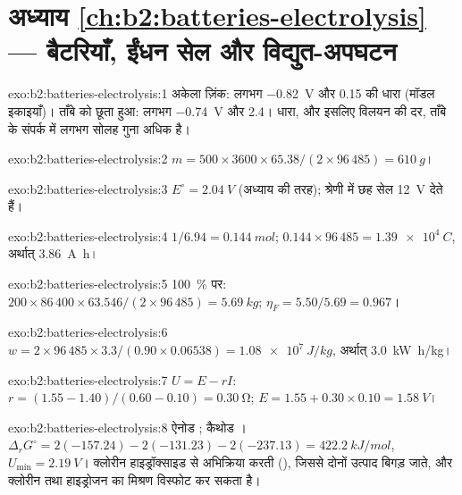 \section*{अध्याय \ref{ch:b2:batteries-electrolysis} --- बैटरियाँ, ईंधन सेल और विद्युत-अपघटन}

\begin{solution}{exo:b2:batteries-electrolysis:1}
अकेला ज़िंक: लगभग \qty{-0.82}{V} और 0.15 की धारा (मॉडल इकाइयाँ)। ताँबे को
छूता हुआ: लगभग \qty{-0.74}{V} और 2.4। धारा, और इसलिए विलयन की दर,
ताँबे के संपर्क में लगभग सोलह गुना अधिक है।
\end{solution}

\begin{solution}{exo:b2:batteries-electrolysis:2}
$m = 500 \times 3600 \times 65.38/(2 \times 96\,485) = \qty{610}{g}$।
\end{solution}

\begin{solution}{exo:b2:batteries-electrolysis:3}
$E^\circ = \qty{2.04}{V}$ (अध्याय की तरह); श्रेणी में छह सेल
\qty{12}{V} देते हैं।
\end{solution}

\begin{solution}{exo:b2:batteries-electrolysis:4}
$1/6.94 = \qty{0.144}{mol}$; $0.144 \times 96\,485 = \qty{1.39e4}{C}$, अर्थात्
\qty{3.86}{A.h}।
\end{solution}

\begin{solution}{exo:b2:batteries-electrolysis:5}
100~\% पर: $200 \times 86\,400 \times 63.546/(2 \times 96\,485) = \qty{5.69}{kg}$;
$\eta_F = 5.50/5.69 = 0.967$।
\end{solution}

\begin{solution}{exo:b2:batteries-electrolysis:6}
$w = 2 \times 96\,485 \times 3.3/(0.90 \times 0.06538) = \qty{1.08e7}{J/kg}$, अर्थात्
\qty{3.0}{kW.h/kg}।
\end{solution}

\begin{solution}{exo:b2:batteries-electrolysis:7}
$U = E - rI$: $r = (1.55 - 1.40)/(0.60 - 0.10) = \qty{0.30}{\ohm}$; $E = 1.55 + 0.30
\times 0.10 = \qty{1.58}{V}$।
\end{solution}

\begin{solution}{exo:b2:batteries-electrolysis:8}
ऐनोड ; कैथोड । $\Delta_r G^\circ =
2(-157.24) - 2(-131.23) - 2(-237.13) = \qty{422.2}{kJ/mol}$, $U_{\min} =
\qty{2.19}{V}$। क्लोरीन हाइड्रॉक्साइड से अभिक्रिया करती (), जिससे दोनों उत्पाद बिगड़ जाते, और क्लोरीन तथा हाइड्रोजन का मिश्रण
विस्फोट कर सकता है।
\end{solution}

